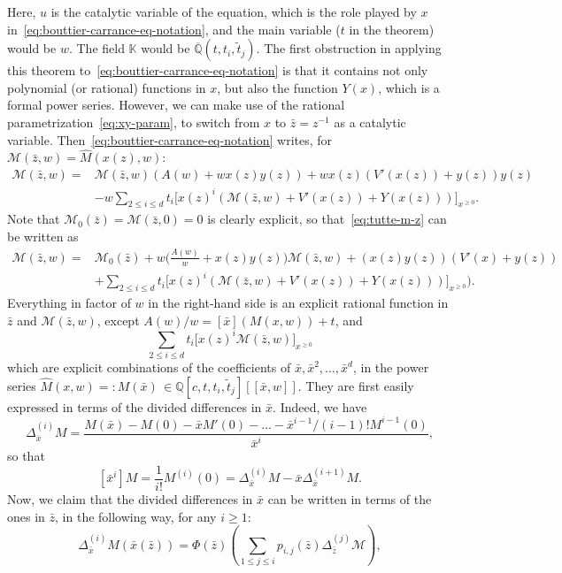 \documentclass{scrartcl}
\newcommand{\Q}{\mathbb{Q}}
\newcommand{\QQ}{\overline{\mathbb{Q}}}
\newcommand{\K}{\mathbb{K}}
\newcommand\wt[1]{\widetilde{#1}}
\newcommand\wh[1]{\widehat{#1}}
\begin{document}
Here, $u$ is the catalytic variable of the equation, which is the role played by $x$ in~\eqref{eq:bouttier-carrance-eq-notation}, and the main variable ($t$ in the theorem) would be $w$. The field $\K$ would be $\QQ(t,t_i,\wt{t}_j)$. The first obstruction in applying this theorem to~\eqref{eq:bouttier-carrance-eq-notation} is that it contains not only polynomial (or rational) functions in $x$, but also the function $Y(x)$, which is a formal power series. However, we can make use of the rational parametrization~\eqref{eq:xy-param}, to switch from $x$ to $\bar{z}=z^{-1}$ as a catalytic variable. Then~\eqref{eq:bouttier-carrance-eq-notation} writes, for $\mathcal{M}(\bar{z},w)=\wh M(x(z),w)$:
\begin{align}
\mathcal{M}(\bar{z},w)=&\mathcal{M}(\bar{z},w)(A(w)+wx(z)y(z))+wx(z)(V'(x(z))+y(z))y(z) \nonumber\\
&-w\sum_{2\leq i \leq d}t_i\Big[x(z)^i(\mathcal{M}(\bar{z},w)+V'(x(z))+Y(x(z))) \Big]_{x^{\geq 0}}.
\label{eq:tutte-m-z}
\end{align}
Note that $\mathcal{M}_0(\bar{z})=\mathcal{M}(\bar{z},0)=0$ is clearly explicit, so that~\eqref{eq:tutte-m-z} can be written as
\begin{align*}
\mathcal{M}(\bar{z},w)=&\mathcal{M}_0(\bar{z}) + w\Big(\frac{A(w)}{w}+x(z)y(z))\mathcal{M}(\bar{z},w)+(x(z)y(z))(V'(x)+y(z)) \\
& + \sum_{2\leq i \leq d}t_i\Big[x(z)^i(\mathcal{M}(\bar{z},w)+V'(x(z))+Y(x(z))) \Big]_{x^{\geq 0}} \Big).
\end{align*}
Everything in factor of $w$ in the right-hand side is an explicit rational function in $\bar{z}$ and $\mathcal{M}(\bar{z},w)$, except $A(w)/w=[\bar{x}](M(x,w))+t$, and 
\[
\sum_{2\leq i \leq d}t_i\Big[x(z)^i\mathcal{M}(\bar{z},w)\Big]_{x^{\geq 0}}
\]
which are explicit combinations of the coefficients of $\bar{x}, \bar{x}^2, \dots, \bar{x}^{d}$, in the power series $\wh M(x,w)=:M(\bar{x}) \, \in \Q[c,t,t_i,\wt{t}_j][[\bar{x},w]]$. They are first easily expressed in terms of the divided differences in $\bar{x}$. Indeed, we have
\[
\Delta^{(i)}_{\bar{x}}M=\frac{M(\bar{x})-M(0)-\bar{x}M'(0)- \dots -\bar{x}^{i-1}/(i-1)! M^{i-1}(0) }{\bar{x}^i},
\]
so that
\[
[\bar{x}^i]M=\frac{1}{i!}M^{(i)}(0)=\Delta^{(i)}_{\bar{x}}M-\bar{x}\Delta^{(i+1)}_{\bar{x}}M.
\]
Now, we claim that the divided differences in $\bar{x}$ can be written in terms of the ones in $\bar{z}$, in the following way, for any $i\geq1$:
\begin{equation}
\Delta_{\bar{x}}^{(i)}M(\bar{x}(\bar{z}))=\Phi(\bar{z})\left(\sum_{1\leq j \leq i}p_{i,j}(\bar{z})\Delta^{(j)}_{\bar{z}}\mathcal{M} \right),
\label{eq:divided-diff-x-to-z}
\end{equation}
\end{document}
